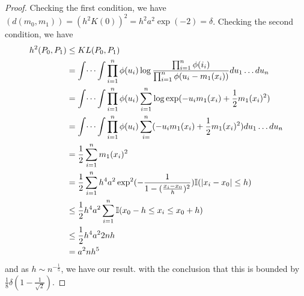 \begin{proof}
  Checking the first condition, we have $(d(m_{0}, m_{1})) = (h^{2}
  K(0))^{2} = h^{2} a^{2} \exp(-2) = \delta$.
  Checking the second condition, we have
  \begin{align}
    \label{eq:117}
    h^{2}(P_{0}, P_{1}) &\leq KL(P_{0}, P_{1}) \\
    \label{eq:102}
    &= \int \dots \int \prod_{i=1}^{n} \phi(u_{i}) \log
    \frac{\prod_{i=1}^{n} \phi(i_{i})}{\prod_{i=1}^{n} \phi(u_{i} -
      m_{1}(x_{i}))} d u_{1} \dots d u_{n} \\
    &= \int \dots \int \prod_{i=1}^{n} \phi(u_{i}) \sum_{i=1}^{n} \log
    \exp(- u_{i} m_{1}(x_{i}) + \frac{1}{2} m_{1}(x_{i})^{2}) \\
    &= \int \dots \int \prod_{i=1}^{n} \phi(u_{i}) \sum_{i=}^{n}  ( -
    u_{i} m_{1}(x_{i}) + \frac{1}{2} m_{1}(x_{i})^{2}) d u_{1} \dots
    du_{n} \\
    &= \frac{1}{2} \sum_{i=1}^{n} m_{1}(x_{i})^{2} \\
    &= \frac{1}{2} \sum_{i=1}^{n} h^{4} a^{2} \exp^{2}(-\frac{1}{1 -
      (\frac{x_{i} - x_{0}}{h})^{2}}) \I{|x_{i} - x_{0}| \leq h} \\
    &\leq \frac{1}{2} h^{4} a^{2} \sum_{i=1}^{n} \I{x_{0} - h \leq
      x_{i} \leq x_{0} + h} \\
    &\leq \frac{1}{2} h^{4} a^{2} 2nh \\
    &= a^{2} nh^{5}
  \end{align}
  and as $h \sim n^{-\frac{1}{5}}$, we have our result.
  with the conclusion that this is bounded by $\frac{1}{8} \delta(1 -
  \frac{1}{\sqrt{2}})$.
\end{proof}

